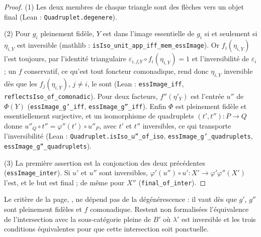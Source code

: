 \begin{proof}
(1) Les deux membres de chaque triangle sont des flèches vers un objet final (Lean : \texttt{Quadruplet.\allowbreak{}degenere}).

(2) Pour $g_i$ pleinement fidèle, $Y$ est dans l'image essentielle de $g_i$ si et seulement si $\eta_{i, Y}$ est inversible (mathlib : \texttt{isIso\_unit\_app\_iff\_mem\_essImage}). Or $f_i(\eta_{i, Y})$ l'est toujours, par l'identité triangulaire $\varepsilon_{i, f_i Y} \circ f_i(\eta_{i, Y}) = 1$ et l'inversibilité de $\varepsilon_i$ ; un $f$ conservatif, ce qu'est tout foncteur comonadique, rend donc $\eta_{i, Y}$ inversible dès que les $f_j(\eta_{i, Y})$, $j \neq i$, le sont (Lean : \texttt{essImage\_iff}, \texttt{reflectsIso\_of\_comonadic}). Pour deux facteurs, $f''(\eta'_Y)$ est l'entrée $u''$ de $\Phi(Y)$ (\texttt{essImage\_g'\_iff}, \texttt{essImage\_g''\_iff}). Enfin $\Phi$ est pleinement fidèle et essentiellement surjective, et un isomorphisme de quadruplets $(t', t'') : P \to Q$ donne $u''_Q \circ t'' = \varphi''(t') \circ u''_P$, avec $t'$ et $t''$ inversibles, ce qui transporte l'inversibilité (Lean : \texttt{Quadruplet.\allowbreak{}isIso\_u''\_of\_iso}, \texttt{essImage\_g'\_quadruplets}, \texttt{essImage\_g''\_quadruplets}).

(3) La première assertion est la conjonction des deux précédentes (\texttt{essImage\_inter}). Si $u'$ et $u''$ sont inversibles, $\varphi'(u'') \circ u' : X' \to \varphi'\varphi''(X')$ l'est, et le but est final ; de même pour $X''$ (\texttt{final\_of\_inter}).
\end{proof}

\begin{remarque}
Le critère de la page, , ne dépend pas de la dégénérescence : il vaut dès que $g'$, $g''$ sont pleinement fidèles et $f$ comonadique. Restent non formalisées l'équivalence de l'intersection avec la sous-catégorie pleine de $B'$ où $\lambda'$ est inversible et les trois conditions équivalentes pour que cette intersection soit ponctuelle.
\end{remarque}

